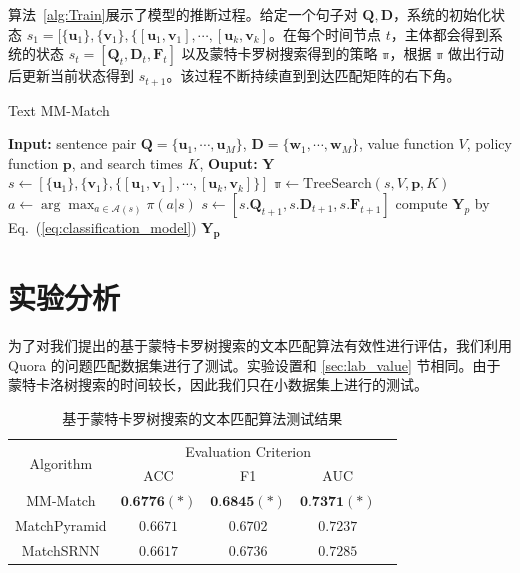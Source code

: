 算法~\ref{alg:Train}展示了模型的推断过程。给定一个句子对 $\mathbf{Q}, \mathbf{D}$，系统的初始化状态 $s_1=[\{\mathbf{u}_1\}, \{\mathbf{v}_1\}, \{[\mathbf{u}_1,\mathbf{v}_1], \cdots, [\mathbf{u}_k, \mathbf{v}_k]$。在每个时间节点 $t$，主体都会得到系统的状态 $s_t=[\mathbf{Q}_t, \mathbf{D}_t, \mathbf{F}_t]$ 以及蒙特卡罗树搜索得到的策略 $\mathbb{\pi}$，根据 $\mathbb{\pi}$ 做出行动后更新当前状态得到 $s_{t+1}$。该过程不断持续直到到达匹配矩阵的右下角。

\begin{algorithm}[!htbp]
\caption{Text MM-Match}\label{alg:RLRank_MCTS}
\renewcommand{\algorithmicrequire}{\textbf{Input:}}
\renewcommand{\algorithmicensure}{\textbf{Output:}}
\begin{algorithmic}[1]
\STATE \textbf{Input:} sentence pair $\mathbf{Q}=\{\mathbf{u}_1, \cdots, \mathbf{u}_M\}$, $\mathbf{D}=\{\mathbf{w}_1, \cdots, \mathbf{w}_M\}$, value function $V$, policy function $\mathbf{p}$, and search times $K$,
\STATE \textbf{Ouput:} $\mathbf{Y}$
\STATE $s \leftarrow [\{\mathbf{u}_1\}, \{\mathbf{v}_1\}, \{[\mathbf{u}_1,\mathbf{v}_1], \cdots, [\mathbf{u}_k, \mathbf{v}_k]\}]$
  \STATE $\mathbb{\pi} \leftarrow \mathrm{TreeSearch}(s, V, \mathbf{p}, K)$
  \STATE $a \leftarrow \arg\max_{a\in\mathcal{A}(s)} \pi(a|s)$
  \STATE $s \leftarrow [s.\mathbf{Q}_{t+1}, s.\mathbf{D}_{t+1}, s.\mathbf{F}_{t+1}]$
\ENDWHILE
\STATE compute $\mathbf{Y}_p$ by Eq.~(\ref{eq:classification_model})
\STATE \RETURN $\mathbf{Y_p}$
\end{algorithmic}
\end{algorithm}


\section{实验分析}
为了对我们提出的基于蒙特卡罗树搜索的文本匹配算法有效性进行评估，我们利用 Quora 的问题匹配数据集进行了测试。实验设置和 \ref{sec:lab_value} 节相同。由于蒙特卡洛树搜索的时间较长，因此我们只在小数据集上进行的测试。
\begin{table}[htbp]
\caption{基于蒙特卡罗树搜索的文本匹配算法测试结果}\label{tab:MCTS_small_test}
\vspace{0.5em}\centering\wuhao
\begin{tabular}{ccccc}
\toprule[1.5pt]
	\multirow{2}{*}{Algorithm} &
	\multicolumn{3}{c}{\multirow{1}{*}{Evaluation Criterion}} \\
	\cline{2-4} & ACC & F1 & AUC \\
	\midrule[1pt]
	MM-Match & $\textbf{0.6776}(*)$ & $\textbf{0.6845}(*)$ & $\textbf{0.7371}(*)$ \\
    MatchPyramid & $0.6671$ & $0.6702$ & $0.7237$ \\
    MatchSRNN & $0.6617$ & $0.6736$ & $0.7285$\\
\bottomrule[1.5pt]
\end{tabular}
\vspace{\baselineskip}
\end{table}

